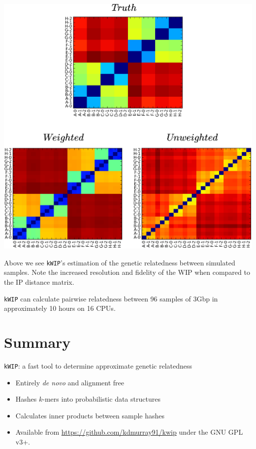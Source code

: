 \documentclass[a0,portrait]{a0poster}
\begin{document}
\begin{multicols}{2}
\begin{center}
  \includegraphics[width=30cm]{mats.png}
  \vspace{1cm}
\end{center}

Above we see \texttt{kWIP}'s estimation of the genetic relatedness between
simulated samples. Note the increased resolution and fidelity of the WIP when
compared to the IP distance matrix.

\texttt{kWIP} can calculate pairwise relatedness between 96 samples of 3Gbp in
approximately 10 hours on 16 CPUs.


\color{ForestGreen}


\section*{Summary}
\Large
\texttt{kWIP}: a fast tool to determine approximate genetic relatedness
\begin{itemize}
  \item Entirely \textit{de novo} and alignment free
  \item Hashes $k$-mers into probabilistic data structures
  \item Calculates inner products between sample hashes
  \item Available from \url{https://github.com/kdmurray91/kwip} under the GNU GPL v3+.
\end{itemize}


\end{multicols}
\end{document}
